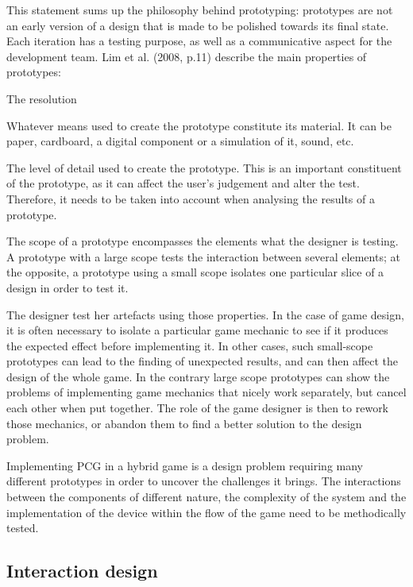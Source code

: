 This statement sums up the philosophy behind prototyping: prototypes are not an early version of a design that is made to be polished towards its final state. Each iteration has a testing purpose, as well as a communicative aspect for the development team. Lim et al. (2008, p.11)\cite{book:proto} describe the main properties of prototypes:

\begin{labeling}{The resolution}
\item [\textbf{The material}] Whatever means used to create the prototype constitute its material. It can be paper, cardboard, a digital component or a simulation of it, sound, etc.
\item [\textbf{The resolution}] The level of detail used to create the prototype. This is an important constituent of the prototype, as it can affect the user's judgement and alter the test. Therefore, it needs to be taken into account when analysing the results of a prototype.
\item [\textbf{The scope}] The scope of a prototype encompasses the elements what the designer is testing. A prototype with a large scope tests the interaction between several elements; at the opposite, a prototype using a small scope isolates one particular slice of a design in order to test it.
\end{labeling}

The designer test her artefacts using those properties. In the case of game design, it is often necessary to isolate a particular game mechanic to see if it produces the expected effect before implementing it. In other cases, such small-scope prototypes can lead to the finding of unexpected results, and can then affect the design of the whole game. In the contrary large scope prototypes can show the problems of implementing game mechanics that nicely work separately, but cancel each other when put together. The role of the game designer is then to rework those mechanics, or abandon them to find a better solution to the design problem. 

Implementing PCG in a hybrid game is a design problem requiring many different prototypes in order to uncover the challenges it brings. The interactions between the components of different nature, the complexity of the system and the implementation of the device within the flow of the game need to be methodically tested. 
\subsection{Interaction design}
